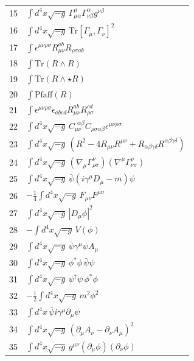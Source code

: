 \documentclass[12pt,a4paper]{article}
\begin{document}
\begin{longtable}{r p{}}
	15 & \(\displaystyle \int d^4x\sqrt{-g}\,\Gamma^{\mu}_{\mu\alpha}\Gamma^{\alpha}_{\nu\beta}g^{\nu\beta}\) \\
	16 & \(\displaystyle \int d^4x\sqrt{-g}\,\mathrm{Tr}[\Gamma_\mu,\Gamma_\nu]^2\) \\
	17 & \(\displaystyle \int \epsilon^{\mu\nu\rho\sigma}R_{\mu\nu}^{ab}R_{\rho\sigma ab}\) \\
	18 & \(\displaystyle \int \mathrm{Tr}(R\wedge R)\) \\
	19 & \(\displaystyle \int \mathrm{Tr}(R\wedge\star R)\) \\
	20 & \(\displaystyle \int \mathrm{Pfaff}(R)\) \\
	21 & \(\displaystyle \int \epsilon^{\mu\nu\rho\sigma}\epsilon_{abcd}R_{\mu\nu}^{ab}R_{\rho\sigma}^{cd}\) \\
	22 & \(\displaystyle \int d^4x\sqrt{-g}\,C_{\mu\nu}^{\ \ \alpha\beta}C_{\rho\sigma\alpha\beta}\epsilon^{\mu\nu\rho\sigma}\) \\
	23 & \(\displaystyle \int d^4x\sqrt{-g}\,(R^2 - 4R_{\mu\nu}R^{\mu\nu} + R_{\alpha\beta\gamma\delta}R^{\alpha\beta\gamma\delta})\) \\
	24 & \(\displaystyle \int d^4x\sqrt{-g}\,(\nabla_\mu\Gamma^{\nu}_{\rho\sigma})(\nabla^\mu\Gamma^{\rho}_{\nu\sigma})\) \\
	25 & \(\displaystyle \int d^4x\sqrt{-g}\,\bar\psi(i\gamma^\mu D_\mu - m)\psi\) \\
	26 & \(\displaystyle -\frac14\int d^4x\sqrt{-g}\,F_{\mu\nu}F^{\mu\nu}\) \\
	27 & \(\displaystyle \int d^4x\sqrt{-g}\,|D_\mu\phi|^2\) \\
	28 & \(\displaystyle -\int d^4x\sqrt{-g}\,V(\phi)\) \\
	29 & \(\displaystyle \int d^4x\sqrt{-g}\,\bar\psi\gamma^\mu\psi A_\mu\) \\
	30 & \(\displaystyle \int d^4x\sqrt{-g}\,\phi^*\phi\,\bar\psi\psi\) \\
	31 & \(\displaystyle \int d^4x\sqrt{-g}\,\psi^\dagger\psi\,\phi^*\phi\) \\
	32 & \(\displaystyle -\frac12\int d^4x\sqrt{-g}\,m^2\phi^2\) \\
	33 & \(\displaystyle \int d^4x\,\bar\psi i\gamma^\mu\partial_\mu\psi\) \\
	34 & \(\displaystyle \int d^4x\sqrt{-g}\,(\partial_\mu A_\nu - \partial_\nu A_\mu)^2\) \\
	35 & \(\displaystyle \int d^4x\sqrt{-g}\,g^{\mu\nu}(\partial_\mu\phi)(\partial_\nu\phi)\) \\

\end{longtable}
\end{document}
